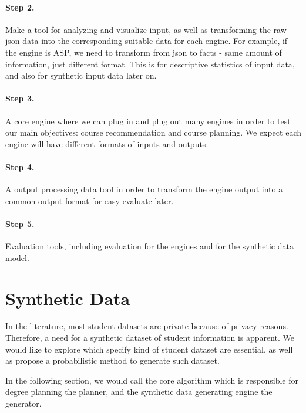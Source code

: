 \documentclass[10pt,a4paper]{article}
\begin{document}
\paragraph{Step 2.} Make a tool for analyzing and visualize input, as well as transforming the raw json data into the corresponding suitable data for each engine. For example, if the engine is ASP, we need to transform from json to facts - same amount of information, just different format. This is for descriptive statistics of input data, and also for synthetic input data later on.

\paragraph{Step 3.} A core engine where we can plug in and plug out many engines in order to test our main objectives: course recommendation and course planning. We expect each engine will have different formats of inputs and outputs.

\paragraph{Step 4.} A output processing data tool in order to transform the engine output into a common output format for easy evaluate later.


\paragraph{Step 5.} Evaluation tools, including evaluation for the engines and for the synthetic data model.




\section{Synthetic Data}

In the literature, most student datasets are private because of privacy reasons. Therefore, a need for a synthetic dataset of student information is apparent. We would like to explore which specify kind of student dataset are essential, as well as propose a probabilistic method to generate such dataset.

In the following section, we would call the core algorithm which is responsible for degree planning the planner, and the synthetic data generating engine the generator.  
\end{document}
